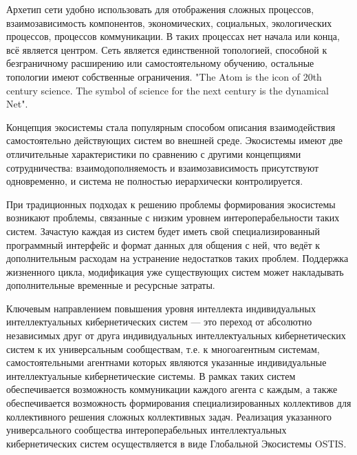 Архетип сети удобно использовать для отображения сложных процессов, взаимозависимость компонентов, экономических, социальных, экологических процессов, процессов коммуникации. В таких процессах нет начала или конца, всё является центром. Сеть является единственной топологией, способной к безграничному расширению или самостоятельному обучению, остальные топологии имеют собственные ограничения. "The Atom is the icon of 20th century science. The symbol of science for the next century is the dynamical Net"{}.

Концепция экосистемы стала популярным способом описания взаимодействия самостоятельно действующих систем во внешней среде. 
Экосистемы имеют две отличительные характеристики по сравнению с другими концепциями сотрудничества: взаимодополняемость и взаимозависимость присутствуют одновременно, и система не полностью иерархически контролируется.

При традиционных подходах к решению проблемы формирования экосистемы возникают проблемы, связанные с низким уровнем интероперабельности таких систем.
Зачастую каждая из систем будет иметь свой специализированный программный интерфейс и формат данных для общения с ней, что ведёт к дополнительным расходам на устранение недостатков таких проблем. Поддержка жизненного цикла, модификация уже существующих систем может накладывать дополнительные временные и ресурсные затраты. 

Ключевым направлением повышения уровня интеллекта индивидуальных интеллектуальных кибернетических систем --- это переход от абсолютно независимых друг от друга индивидуальных интеллектуальных кибернетических систем к их универсальным сообществам, т.е. к многоагентным системам, самостоятельными агентнами которых являются указанные индивидуальные интеллектуальные кибернетические системы.
В рамках таких систем обеспечивается возможность коммуникации каждого агента с каждым, а также обеспечивается возможность формирования специализированных коллективов для коллективного решения сложных коллективных задач.
Реализация указанного универсального сообщества интероперабельных интеллектуальных кибернетических систем осуществляется в виде Глобальной Экосистемы OSTIS. 